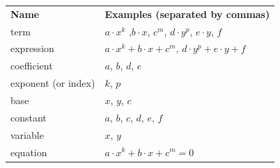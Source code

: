           \begin{table}[H]
        \begin{center}
      \label{m39383*uid3}
    \noindent
      \tablelasttail{}
      \begin{xtabular}[t]{|l|l|}\hline
        \textbf{Name} &
        \textbf{Examples (separated by commas)}%
     \tabularnewline{}
        term &
        $a\ensuremath{\cdot}{x}^{k}$ ,$b\ensuremath{\cdot}x$, ${c}^{m}$, $d\ensuremath{\cdot}{y}^{p}$, $e\ensuremath{\cdot}y$, $f$\hspace{20ex}%
     \tabularnewline{}
        expression &
        $a\ensuremath{\cdot}{x}^{k}+b\ensuremath{\cdot}x+{c}^{m}$, $d\ensuremath{\cdot}{y}^{p}+e\ensuremath{\cdot}y+f$%
     \tabularnewline{}
        coefficient &
        $a$, $b$, $d$, $e$%
     \tabularnewline{}
        exponent (or index) &
        $k$, $p$%
     \tabularnewline{}
        base &
        $x$, $y$, $c$%
     \tabularnewline{}
        constant &
        $a$, $b$, $c$, $d$, $e$, $f$%
     \tabularnewline{}
        variable &
        $x$, $y$%
     \tabularnewline{}
        equation &
                  $a\ensuremath{\cdot}{x}^{k}+b\ensuremath{\cdot}x+{c}^{m}=0$
     \tabularnewline{}

\end{xtabular}
\end{center}
\end{table}

